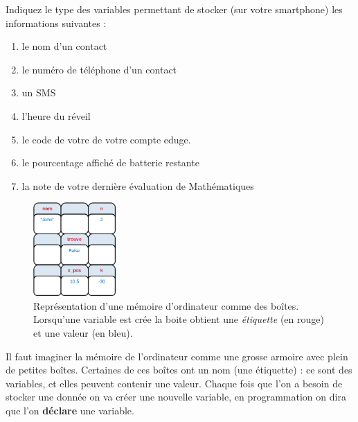 \vspace{1cm}
\act Indiquez le type des variables permettant de stocker (sur votre smartphone) les informations suivantes :
\begin{enumerate}[label=\alph*)]
	\item le nom d’un contact
	\item le numéro de téléphone d’un contact
	\item un SMS
	\item l’heure du réveil
	\item le code de votre de votre compte eduge.
	\item le pourcentage affiché de batterie restante
	\item la note de votre dernière évaluation de Mathématiques
\end{enumerate}

\vspace{1cm}

\newpage

\begin{figure}
	\centering
	\includegraphics[width=0.28\textwidth]{Images/variables/memoire}
	\caption{\small Représentation d'une mémoire d'ordinateur  comme des boîtes. Lorsqu'une variable est crée la boite obtient une \textit{étiquette} (en rouge) et une valeur (en bleu).}
\end{figure}
Il faut imaginer la mémoire de l’ordinateur comme une grosse armoire avec plein de petites boîtes. 
Certaines de ces boîtes ont un nom (une étiquette) : ce sont des variables, et elles peuvent contenir une valeur. Chaque fois que l'on a besoin de stocker une donnée on va créer une nouvelle variable, en programmation on dira que l'on \textbf{déclare} une variable.

